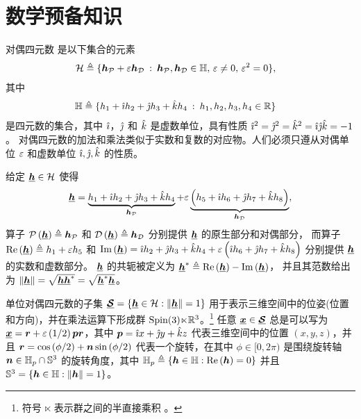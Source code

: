 
\section{\normalfont\bfseries 数学预备知识 \label{sec:Mathematical-Preliminaries}}

对偶四元数 \cite{Selig2005} 是以下集合的元素
\begin{align}
\mathcal{H} & \triangleq\{\quat h_{\mathcal{P}}+\dual\quat h_{\mathcal{D}}\::\:\quat h_{\mathcal{P}},\quat h_{\mathcal{D}}\in\mathbb{H},\,\dual\neq0,\,\dual^{2}=0\},\label{eq:dq_def}
\end{align}
其中
\begin{align}
\mathbb{H} & \triangleq\{h_{1}+\imi h_{2}+\imj h_{3}+\imk h_{4}\::\:h_{1},h_{2},h_{3},h_{4}\in\mathbb{R}\}\label{eq:quat_def}
\end{align}
是四元数的集合，其中 $\imi$，$\imj$ 和 $\imk$ 是虚数单位，具有性质 $\imi^{2}=\imj^{2}=\imk^{2}=\imi\imj\imk=-1$\cite{Hamilton1844}。
对偶四元数的加法和乘法类似于实数和复数的对应物。人们必须只遵从对偶单位 $\dual$ 和虚数单位 $\imi,\imj,\imk$ 的性质。

给定 $\dq h\in\mathcal{H}$ 使得
\[
\dq h=\underbrace{h_{1}+\imi h_{2}+\imj h_{3}+\imk h_{4}}_{\quat h_{\mathcal{P}}}+\dual\underbrace{\left(h_{5}+\imi h_{6}+\imj h_{7}+\imk h_{8}\right)}_{\quat h_{\mathcal{D}}},
\]
算子 $\mathcal{P}\left(\dq h\right)\triangleq\quat h_{\mathcal{P}}$
和 $\mathcal{D}\left(\dq h\right)\triangleq\quat h_{\mathcal{D}}$
分别提供 $\dq h$ 的原生部分和对偶部分，
而算子 $\real{\dq h}\triangleq h_{1}+\dual h_{5}$
和 $\imag{\dq h}=\imi h_{2}+\imj h_{3}+\imk h_{4}+\dual\left(\imi h_{6}+\imj h_{7}+\imk h_{8}\right)$
分别提供 $\dq h$ 的实数和虚数部分。
$\dq h$ 的共轭被定义为 $\dq h^{*}\triangleq\real{\dq h}-\imag{\dq h}$，
并且其范数给出为 $\norm{\dq h}=\sqrt{\dq h\dq h^{*}}=\sqrt{\dq h^{*}\dq h}$。

单位对偶四元数的子集 $\dq{\mathcal{S}}=\left\{ \dq h\in\mathcal{H}:\norm{\dq h}=1\right\} $ 用于表示三维空间中的位姿(位置和方向)，并在乘法运算下形成群 $\spinr$。\footnote{符号 $\ltimes$ 表示群之间的半直接乘积
\cite[p. 22]{Selig2005}。} 任意 $\dq x\in\dq{\mathcal{S}}$ 总是可以写为 $\dq x=\quat r+\dual\left(1/2\right)\quat p\quat r$，其中 $\quat p=\imi x+\imj y+\imk z$ 代表三维空间中的位置 $\left(x,y,z\right)$，并且 $\quat r=\cos\left(\phi/2\right)+\quat n\sin\left(\phi/2\right)$ 代表一个旋转，在其中 $\phi\in[0,2\pi)$ 是围绕旋转轴 $\quat n\in\mathbb{H}_{p}\cap\mathbb{S}^{3}$ 的旋转角度，其中 $\mathbb{H}_{p}\triangleq\left\{ \quat h\in\mathbb{H}:\real{\quat h}=0\right\} $ 并且 $\mathbb{S}^{3}=\left\{ \quat h\in\mathbb{H}:\norm{\quat h}=1\right\} $\cite{Selig2005}。

